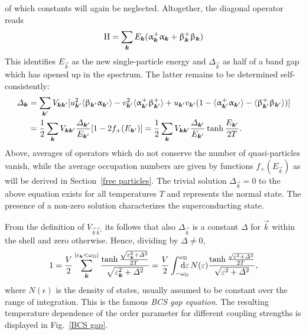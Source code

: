 %
of which constants will again be neglected. Altogether, the diagonal
 operator reads
%
\begin{equation*}
    \mathrm H =
    \sum_{\boldsymbol k} E_{\boldsymbol k}
        ( \upalpha_{\boldsymbol k}^+ \upalpha_{\boldsymbol k}
        + \upbeta_{\boldsymbol k}^+ \upbeta_{\boldsymbol k} )
\end{equation*}
%
This identifies $E_{\vec k}$ as the new single-particle energy and $\Delta_{\vec
k}$ as half of a band gap which has opened up in the spectrum. The latter
remains to be determined self-consistently:
%
\begin{align*}
    \varDelta_{\boldsymbol k} &= \sum_{\boldsymbol k'} V_{\boldsymbol k \boldsymbol k'} [
        u_{\boldsymbol k'}^2 \langle\upbeta_{\boldsymbol k'} \upalpha_{\boldsymbol k'}\rangle
        - v_{\boldsymbol k'}^2 \langle\upalpha_{\boldsymbol k'}^+ \upbeta_{\boldsymbol k'}^+\rangle
        + u_{\boldsymbol k'} v_{\boldsymbol k'} (
            1 - \langle\upalpha_{\boldsymbol k'}^+ \upalpha_{\boldsymbol k'}\rangle
            - \langle\upbeta_{\boldsymbol k'}^+ \upbeta_{\boldsymbol k'}\rangle
            )
        ]
    \\
    &= \frac 1 2 \sum_{\boldsymbol k} V_{\boldsymbol k \boldsymbol k'}
    \frac{\varDelta_{\boldsymbol k'}}{E_{\boldsymbol k'}} [1 - 2 f_+(E_{\boldsymbol k'})]
    = \frac 1 2 \sum_{\boldsymbol k} V_{\boldsymbol k \boldsymbol k'}
    \frac{\varDelta_{\boldsymbol k'}}{E_{\boldsymbol k'}} \tanh \frac{E_{\boldsymbol k'}}{2 T}.
\end{align*}
%
Above, averages of operators which do not conserve the number of
 quasi-particles vanish, while the average occupation numbers
are given by  functions $f_+(E_{\vec k})$ as will be derived in
Section~\ref{free particles}. The trivial solution $\Delta_{\vec k} = 0$ to the
above equation exists for all temperatures $T$ and represents the normal state.
The presence of a non-zero solution characterizes the superconducting state.

From the definition of $V_{\vec k \vec k'}$ its follows that also $\Delta_{\vec
k}$ is a constant $\Delta$ for $\vec k$ within the  shell and zero
otherwise. Hence, dividing by $\Delta \neq 0$,
%
\begin{equation*}
    1 = \frac V 2
    \sum_{\vec k}^{|\epsilon_{\vec k} < \omega \sub D|}
    \frac
        {\tanh \frac{\sqrt{\epsilon_{\vec k}^2 + \Delta^2}}{2 T}}
        {\sqrt{\epsilon_{\vec k}^2 + \Delta^2}}
    = \frac V 2 \int \from{-\omega \sub D} \till{\omega \sub D} \D \epsilon \,
    N(\epsilon) \frac
        {\tanh \frac{\sqrt{\epsilon^2 + \Delta^2}}{2 T}}
        {\sqrt{\epsilon^2 + \Delta^2}},
\end{equation*}
%
where $N(\epsilon)$ is the density of states, usually assumed to be constant
over the range of integration. This is the famous \emph{BCS gap equation}. The
resulting temperature dependence of the order parameter for different coupling
strengths is displayed in Fig.~\ref{BCS gap}.
